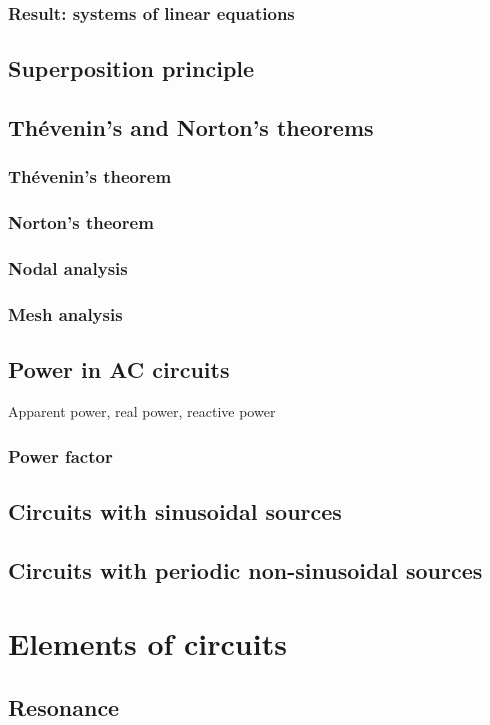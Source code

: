 \documentclass{report}
\begin{document}
\subsection{Result: systems of linear equations}
\section{Superposition principle}
\section{Thévenin's and Norton's theorems}
\subsection{Thévenin's theorem}
\subsection{Norton's theorem}
\subsection{Nodal analysis}
\subsection{Mesh analysis}
\section{Power in AC circuits}
Apparent power, real power, reactive power
\subsection{Power factor}
\section{Circuits with sinusoidal sources}
\section{Circuits with periodic non-sinusoidal sources}

\chapter{Elements of circuits}
\section{Resonance}
\end{document}

